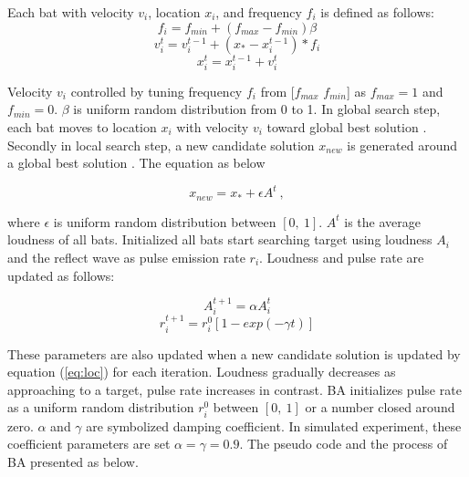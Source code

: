 \documentclass{ies2018}
\begin{document}
Each bat with velocity ${v_i}$, location ${x_i}$, and frequency ${f_i}$ is defined as follows:
\begin{equation}
f_{i} =f_{min}+(f_{max}-f_{min}) \beta
\label{eq:freq} 
\end{equation}
\begin{equation}
v_i^t=v_i^{t-1}+(x_*-x_i^{t-1})* f_i
\label{eq:vel}
\end{equation}
\begin{equation}
x_i^t=x_i^{t-1}+v_i^t
\label{eq:xi}
\end{equation}

Velocity ${v_i}$ controlled by tuning frequency ${f_i}$ from [${f_{max}}$ ${f_{min}}$] as ${f_{max}}=1$ and ${f_{min}}=0$. $\beta $ is uniform random distribution from 0 to 1. In global search step, each bat moves to location ${x_i}$ with velocity ${v_i}$ toward global best solution
. Secondly in local search step, a new candidate solution ${x_{new}}$ is generated around a global best solution
. The equation as below

\begin{equation}
x_{new}=x_{*}+ \epsilon A^t \ ,
\label{eq:loc}
\end{equation}

where ${\epsilon}$ is uniform random distribution between ${[0,  \ 1]}$. ${A^t}$ is the average loudness of all bats. Initialized all bats start searching target using loudness ${A_i}$ and the reflect wave as pulse emission rate ${r_i}$. Loudness and pulse rate are updated as follows:

\begin{equation}
A_i^{t+1}=\alpha A_i^t
\label{eq:A}
\end{equation}
\begin{equation}
r_i^{t+1}=r_i^0[1-exp(-\gamma t)]
\label{eq:r}
\end{equation}

These parameters are also updated when a new candidate solution is updated by equation (\ref{eq:loc}) for each iteration. Loudness gradually decreases as approaching to a target, pulse rate increases in contrast. BA initializes pulse rate as a uniform random distribution ${r_i^0}$ between ${[0, \ 1]}$ or a number closed around zero. ${\alpha}$ and ${\gamma}$ are symbolized damping coefficient. In simulated experiment, these coefficient parameters are set ${\alpha = \gamma = 0.9}$. The pseudo code and the process of BA presented as below.
\end{document}
